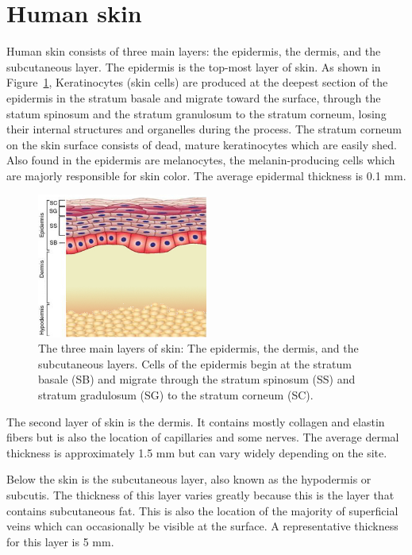 \section{Human skin}
\label{sec:skin}
Human skin consists of three main layers: the epidermis, the dermis, and the subcutaneous layer.\cite{Fodor2011a} The epidermis is the top-most layer of skin. As shown in Figure~\ref{fig:intro-skin_layers}, Keratinocytes (skin cells) are produced at the deepest section of the epidermis in the stratum basale and migrate toward the surface, through the statum spinosum and the stratum granulosum to the stratum corneum, losing their internal structures and organelles during the process. The stratum corneum on the skin surface consists of dead, mature keratinocytes which are easily shed. Also found in the epidermis are melanocytes, the melanin-producing cells which are majorly responsible for skin color. The average epidermal thickness is 0.1 mm.\cite{Yang2009}

\begin{figure}
	\centering \includegraphics[width=0.5\textwidth]{figures/intro-skin_layers.jpg}
	\caption[Cross-section of layers of human skin]{\label{fig:intro-skin_layers}The three main layers of skin: The epidermis, the dermis, and the subcutaneous layers. Cells of the epidermis begin at the stratum basale (SB) and migrate through the stratum spinosum (SS) and stratum gradulosum (SG) to the stratum corneum (SC).}
\end{figure}

The second layer of skin is the dermis. It contains mostly collagen and elastin fibers but is also the location of capillaries and some nerves. The average dermal thickness is approximately 1.5 mm but can vary widely depending on the site.

Below the skin is the subcutaneous layer, also known as the hypodermis or subcutis. The thickness of this layer varies greatly because this is the layer that contains subcutaneous fat. This is also the location of the majority of superficial veins which can occasionally be visible at the surface. A representative thickness for this layer is 5 mm.

